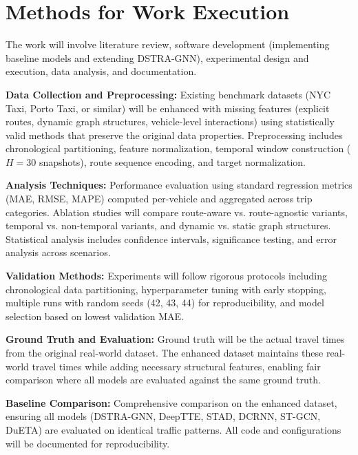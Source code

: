 \section{Methods for Work Execution}

The work will involve literature review, software development (implementing baseline models and extending DSTRA-GNN), experimental design and execution, data analysis, and documentation.

\textbf{Data Collection and Preprocessing:} Existing benchmark datasets (NYC Taxi, Porto Taxi, or similar) will be enhanced with missing features (explicit routes, dynamic graph structures, vehicle-level interactions) using statistically valid methods that preserve the original data properties. Preprocessing includes chronological partitioning, feature normalization, temporal window construction ($H=30$ snapshots), route sequence encoding, and target normalization.

\textbf{Analysis Techniques:} Performance evaluation using standard regression metrics (MAE, RMSE, MAPE) computed per-vehicle and aggregated across trip categories. Ablation studies will compare route-aware vs. route-agnostic variants, temporal vs. non-temporal variants, and dynamic vs. static graph structures. Statistical analysis includes confidence intervals, significance testing, and error analysis across scenarios.

\textbf{Validation Methods:} Experiments will follow rigorous protocols including chronological data partitioning, hyperparameter tuning with early stopping, multiple runs with random seeds (42, 43, 44) for reproducibility, and model selection based on lowest validation MAE.

\textbf{Ground Truth and Evaluation:} Ground truth will be the actual travel times from the original real-world dataset. The enhanced dataset maintains these real-world travel times while adding necessary structural features, enabling fair comparison where all models are evaluated against the same ground truth.

\textbf{Baseline Comparison:} Comprehensive comparison on the enhanced dataset, ensuring all models (DSTRA-GNN, DeepTTE, STAD, DCRNN, ST-GCN, DuETA) are evaluated on identical traffic patterns. All code and configurations will be documented for reproducibility.


